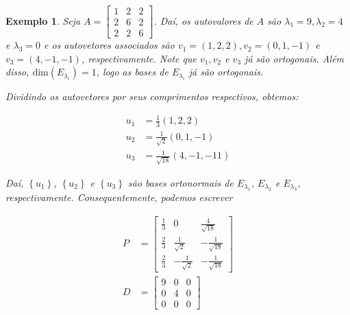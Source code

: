 \documentclass{article}
\newtheorem*{example}{Exemplo}
\begin{document}
\begin{example}
	Seja $A = \begin{bmatrix}
	1 & 2 & 2 \\
	2 & 6 & 2 \\
	2 & 2 & 6
	\end{bmatrix}$. Daí, os autovalores de $A$ são $\lambda_1 = 9, \lambda_2 = 4$ e $\lambda_3 = 0$ e os autovetores associados são $v_1 = (1,2,2), v_2 = (0,1,-1)$ e $v_3 = (4,-1,-1)$, respectivamente. Note que $v_1, v_2$ e $v_3$ já são ortogonais. Além disso, $\text{dim}(E_{\lambda_i}) = 1$, logo as bases de $E_{\lambda_i}$ já são ortogonais. 
	
	\par\vspace{0.3cm} Dividindo os autovetores por seus comprimentos respectivos, obtemos:
	
	\begin{align*}
	u_1 &= \frac{1}{3}(1,2,2) \\
	u_2 &= \frac{1}{\sqrt{2}}(0,1,-1)\\
	u_3 &= \frac{1}{\sqrt{18}}(4,-1,-11)
	\end{align*}
	
	\par\vspace{0.3cm} Daí, $\left\{ u_1  \right\}$, $\left\{ u_2  \right\}$ e $\left\{ u_3  \right\}$ são bases ortonormais de $E_{\lambda_1}$, $E_{\lambda_2}$ e $E_{\lambda_3}$, respectivamente. Consequentemente, podemos escrever
	
	\begin{align*}
	P &= \begin{bmatrix}
	\displaystyle{\frac{1}{3}} & 0 & \displaystyle{\frac{4}{\sqrt{18}}} \\
	\displaystyle{\frac{2}{3}} & \displaystyle{\frac{1}{\sqrt{2}}} & \displaystyle{-\frac{1}{\sqrt{18}}} \\
	\displaystyle{\frac{2}{3}} & \displaystyle{-\frac{1}{\sqrt{2}}} & \displaystyle{-\frac{1}{\sqrt{18}}}
	\end{bmatrix}\\
	D &= \begin{bmatrix}
	9 & 0 & 0 \\
	0 & 4 & 0 \\
	0 & 0 & 0 
	\end{bmatrix}
	\end{align*}
	
\end{example}
\end{document}
